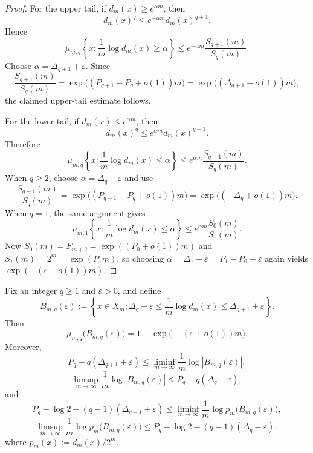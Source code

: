 \begin{proof}
For the upper tail, if \(d_m(x)\ge e^{\alpha m}\), then
\[
  d_m(x)^q\le e^{-\alpha m}d_m(x)^{q+1}.
\]
Hence
\[
  \mu_{m,q}\!\left\{
    x:\frac1m\log d_m(x)\ge \alpha
  \right\}
  \le
  e^{-\alpha m}\frac{S_{q+1}(m)}{S_q(m)}.
\]
Choose \(\alpha=\Delta_{q+1}+\varepsilon\).  Since
\[
  \frac{S_{q+1}(m)}{S_q(m)}=\exp\bigl((P_{q+1}-P_q+o(1))m\bigr)
  =
  \exp\bigl((\Delta_{q+1}+o(1))m\bigr),
\]
the claimed upper-tail estimate follows.

For the lower tail, if \(d_m(x)\le e^{\alpha m}\), then
\[
  d_m(x)^q\le e^{\alpha m}d_m(x)^{q-1}.
\]
Therefore
\[
  \mu_{m,q}\!\left\{
    x:\frac1m\log d_m(x)\le \alpha
  \right\}
  \le
  e^{\alpha m}\frac{S_{q-1}(m)}{S_q(m)}.
\]
When \(q\ge 2\), choose \(\alpha=\Delta_q-\varepsilon\) and use
\[
  \frac{S_{q-1}(m)}{S_q(m)}
  =
  \exp\bigl((P_{q-1}-P_q+o(1))m\bigr)
  =
  \exp\bigl((-\Delta_q+o(1))m\bigr).
\]
When \(q=1\), the same argument gives
\[
  \mu_{m,1}\!\left\{
    x:\frac1m\log d_m(x)\le \alpha
  \right\}
  \le
  e^{\alpha m}\frac{S_0(m)}{S_1(m)}.
\]
Now \(S_0(m)=F_{m+2}=\exp((P_0+o(1))m)\) and \(S_1(m)=2^m=\exp(P_1m)\), so
choosing \(\alpha=\Delta_1-\varepsilon=P_1-P_0-\varepsilon\) again yields
\(\exp(-(\varepsilon+o(1))m)\).
\end{proof}

\begin{theorem}
\label{thm:microcanonical-bands}
Fix an integer \(q\ge 1\) and \(\varepsilon>0\), and define
\[
  B_{m,q}(\varepsilon)
  :=
  \left\{
    x\in X_m:
    \Delta_q-\varepsilon\le \frac1m\log d_m(x)\le \Delta_{q+1}+\varepsilon
  \right\}.
\]
Then
\[
  \mu_{m,q}\bigl(B_{m,q}(\varepsilon)\bigr)
  =
  1-\exp\bigl(-(\varepsilon+o(1))m\bigr).
\]
Moreover,
\[
  P_q-q(\Delta_{q+1}+\varepsilon)
  \le
  \liminf_{m\to\infty}\frac1m\log |B_{m,q}(\varepsilon)|,
\]
\[
  \limsup_{m\to\infty}\frac1m\log |B_{m,q}(\varepsilon)|
  \le
  P_q-q(\Delta_q-\varepsilon),
\]
and
\[
  P_q-\log 2-(q-1)(\Delta_{q+1}+\varepsilon)
  \le
  \liminf_{m\to\infty}\frac1m\log p_m\bigl(B_{m,q}(\varepsilon)\bigr),
\]
\[
  \limsup_{m\to\infty}\frac1m\log p_m\bigl(B_{m,q}(\varepsilon)\bigr)
  \le
  P_q-\log 2-(q-1)(\Delta_q-\varepsilon),
\]
where \(p_m(x):=d_m(x)/2^m\).
\end{theorem}

